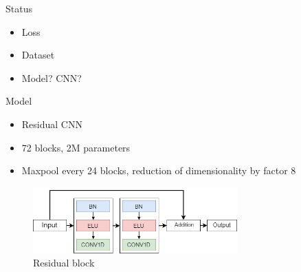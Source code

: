 \documentclass[10pt]{beamer}
\begin{document}

\begin{frame}[fragile]{Status}
 	\begin{itemize}
	\item Loss 
	\item Dataset
	\item \alert{Model? CNN?}
\end{itemize}
\end{frame}

\begin{frame}[fragile]{Model}
	\begin{itemize}
		\item<1-> Residual CNN
		\item<2-> 72 blocks, 2M parameters
		\item<3-> Maxpool every 24 blocks, reduction of dimensionality by factor 8
	\end{itemize}
	 {
		\begin{figure}
			\begin{center}
				\includegraphics[width=0.7\textwidth]{./imgs/model/block_small.png}%
				\caption{Residual block}	
			\end{center}
		\end{figure}
	}
\end{frame}


\end{document}
